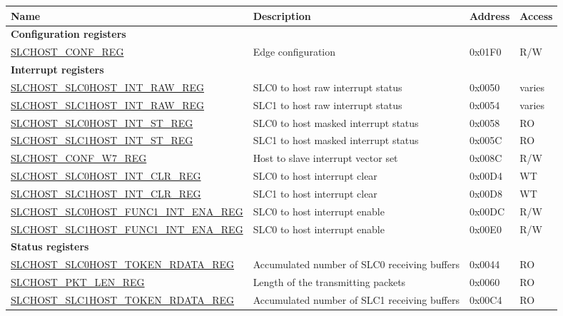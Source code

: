 \begin{longtable}{ | p{7.1cm} | p{5.1cm} | p{2.4cm} | p{1cm} | }
\hline\rowcolor{lightgray}
Name & Description &  Address & Access \\ \hline
\endhead
\multicolumn{4}{|l|}{\textbf{Configuration registers}} \\ \hline
\hyperref[regdesc:SLCHOSTCONFREG]{SLCHOST\_CONF\_REG} & Edge configuration & 0x01F0 & R/W \\ \hline
\multicolumn{4}{|l|}{\textbf{Interrupt registers}} \\ \hline
\hyperref[regdesc:SLCHOSTSLC0HOSTINTRAWREG]{SLCHOST\_SLC0HOST\_INT\_RAW\_REG} & SLC0 to host raw interrupt status & 0x0050 & varies \\ \hline
\hyperref[regdesc:SLCHOSTSLC1HOSTINTRAWREG]{SLCHOST\_SLC1HOST\_INT\_RAW\_REG} & SLC1 to host raw interrupt status & 0x0054 & varies \\ \hline
\hyperref[regdesc:SLCHOSTSLC0HOSTINTSTREG]{SLCHOST\_SLC0HOST\_INT\_ST\_REG} & SLC0 to host masked interrupt status & 0x0058 & RO \\ \hline
\hyperref[regdesc:SLCHOSTSLC1HOSTINTSTREG]{SLCHOST\_SLC1HOST\_INT\_ST\_REG} & SLC1 to host masked interrupt status & 0x005C & RO \\ \hline
\hyperref[regdesc:SLCHOSTCONFW7REG]{SLCHOST\_CONF\_W7\_REG} & Host to slave interrupt vector set & 0x008C & R/W \\ \hline
\hyperref[regdesc:SLCHOSTSLC0HOSTINTCLRREG]{SLCHOST\_SLC0HOST\_INT\_CLR\_REG} & SLC0 to host interrupt clear & 0x00D4 & WT \\ \hline
\hyperref[regdesc:SLCHOSTSLC1HOSTINTCLRREG]{SLCHOST\_SLC1HOST\_INT\_CLR\_REG} & SLC1 to host interrupt clear & 0x00D8 & WT \\ \hline
\hyperref[regdesc:SLCHOSTSLC0HOSTFUNC1INTENAREG]{SLCHOST\_SLC0HOST\_FUNC1\_INT\_ENA\_REG} & SLC0 to host interrupt enable & 0x00DC & R/W \\ \hline
\hyperref[regdesc:SLCHOSTSLC1HOSTFUNC1INTENAREG]{SLCHOST\_SLC1HOST\_FUNC1\_INT\_ENA\_REG} & SLC0 to host interrupt enable & 0x00E0 & R/W \\ \hline
\multicolumn{4}{|l|}{\textbf{Status registers}} \\ \hline
\hyperref[regdesc:SLCHOSTSLC0HOSTTOKENRDATAREG]{SLCHOST\_SLC0HOST\_TOKEN\_RDATA\_REG} & Accumulated number of SLC0 receiving buffers & 0x0044 & RO \\ \hline
\hyperref[regdesc:SLCHOSTPKTLENREG]{SLCHOST\_PKT\_LEN\_REG} & Length of the transmitting packets & 0x0060 & RO \\ \hline
\hyperref[regdesc:SLCHOSTSLC1HOSTTOKENRDATAREG]{SLCHOST\_SLC1HOST\_TOKEN\_RDATA\_REG} & Accumulated number of SLC1 receiving buffers & 0x00C4 & RO \\ \hline


\end{longtable}
